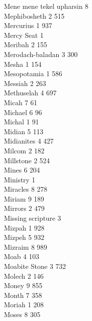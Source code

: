 Mene mene tekel upharsin \hfill 8 \\
Mephibosheth \hfill 2 \quad \phantom{0}515\\
Mercurius \hfill 1 \quad \phantom{0}937\\
Mercy Seat \hfill 1 \\
Meribah \hfill 2 \quad \phantom{0}155\\
Merodach-baladan \hfill 3 \quad \phantom{0}300\\
Mesha \hfill 1 \quad \phantom{0}154\\
Mesopotamia \hfill 1 \quad \phantom{0}586\\
Messiah \hfill 2 \quad \phantom{0}263\\
Methuselah \hfill 4 \quad \phantom{0}697\\
Micah \hfill 7 \quad \phantom{0}\phantom{0}61\\
Michael \hfill 6 \quad \phantom{0}\phantom{0}96\\
Michal \hfill 1 \quad \phantom{0}\phantom{0}91\\
Midian \hfill 5 \quad \phantom{0}113\\
Midianites \hfill 4 \quad \phantom{0}427\\
Milcom \hfill 2 \quad \phantom{0}182\\
Millstone \hfill 2 \quad \phantom{0}524\\
Mines \hfill 6 \quad \phantom{0}204\\
Ministry \hfill 1 \\
Miracles \hfill 8 \quad \phantom{0}278\\
Miriam \hfill 9 \quad \phantom{0}189\\
Mirrors \hfill 2 \quad \phantom{0}479\\
Missing scripture \hfill 3 \\
Mizpah \hfill 1 \quad \phantom{0}928\\
Mizpeh \hfill 5 \quad \phantom{0}932\\
Mizraim \hfill 8 \quad \phantom{0}989\\
Moab \hfill 4 \quad \phantom{0}103\\
Moabite Stone \hfill 3 \quad \phantom{0}732\\
Molech \hfill 2 \quad \phantom{0}146\\
Money \hfill 9 \quad \phantom{0}855\\
Month \hfill 7 \quad \phantom{0}358\\
Moriah \hfill 1 \quad \phantom{0}208\\
Moses \hfill 8 \quad \phantom{0}305\\

